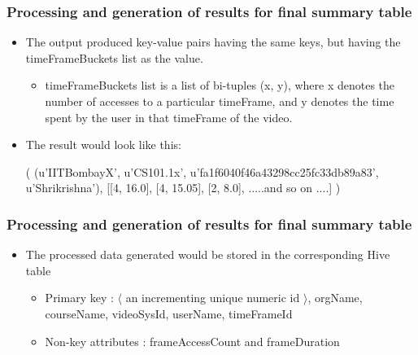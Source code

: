 \documentclass[12pt,xcolor=dvipsnames]{beamer}
\begin{document}
\begin{frame}[t]
\frametitle{Processing and generation of results for final summary table}
\vfill
\begin{itemize}

\item The output produced
key-value pairs having the same keys, but having the timeFrameBuckets list as the value.

\begin{itemize}
\item timeFrameBuckets list is a list of bi-tuples (x, y), where x denotes the number of accesses to a particular
timeFrame, and y denotes the time spent by the user in that timeFrame of the video.
\end{itemize}

\item The result would look like this:

\begin{scriptsize}
(
(u’IITBombayX’, u’CS101.1x’,
u’fa1f6040f46a43298cc25fc33db89a83’, u’Shrikrishna’), [[4, 16.0],
[4, 15.05],
[2, 8.0],
.....and so on ....]
)
\end{scriptsize}


\end{itemize}
\end{frame}



\begin{frame}[t]
\frametitle{Processing and generation of results for final summary table}
\vfill
\begin{itemize}

\item The processed data generated
would be stored in the corresponding Hive table

\begin{itemize}

\item Primary key : $\langle$ an incrementing unique numeric id $\rangle$, orgName, courseName, videoSysId, userName, timeFrameId
\item Non-key attributes : frameAccessCount and frameDuration

\end{itemize}


\end{itemize}
\end{frame}
\end{document}
